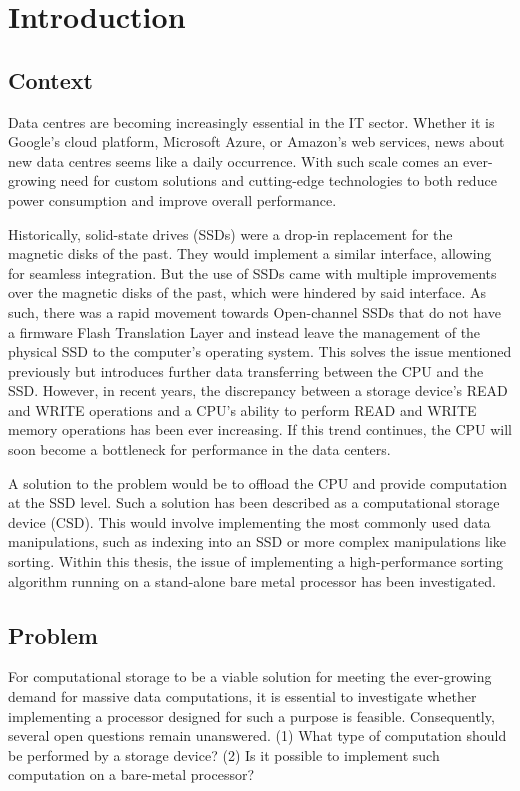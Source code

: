 \section{Introduction}
\subsection{Context}\label{sec:context}
Data centres are becoming increasingly essential in the IT sector. Whether it is
Google's cloud platform, Microsoft Azure, or Amazon's web services, news about
new data centres seems like a daily occurrence. With such scale comes an
ever-growing need for custom solutions and cutting-edge technologies to both
reduce power consumption and improve overall performance.

Historically, solid-state drives (SSDs) were a drop-in replacement for the
magnetic disks of the past. They would implement a similar interface, allowing
for seamless integration. But the use of SSDs came with multiple improvements
over the magnetic disks of the past, which were hindered by said interface. As
such, there was a rapid movement towards Open-channel SSDs that do not have a
firmware Flash Translation Layer and instead leave the management of the
physical SSD to the computer's operating system. This solves the issue mentioned
previously but introduces further data transferring between the CPU and the SSD.
However, in recent years, the discrepancy between a storage device's READ and
WRITE operations and a CPU's ability to perform READ and WRITE memory operations
has been ever increasing. If this trend continues, the CPU will soon become a
bottleneck for performance in the data centers.

A solution to the problem would be to offload the CPU and provide computation at
the SSD level. Such a solution has been described as a computational storage
device (CSD). This would involve implementing the most commonly used data
manipulations, such as indexing into an SSD or more complex manipulations like
sorting. Within this thesis, the issue of implementing a high-performance
sorting algorithm running on a stand-alone bare metal processor has been
investigated.


\subsection{Problem}
For computational storage to be a viable solution for meeting the ever-growing
demand for massive data computations, it is essential to investigate whether
implementing a processor designed for such a purpose is feasible. Consequently,
several open questions remain unanswered. (1) What type of computation should be
performed by a storage device? (2) Is it possible to implement such computation
on a bare-metal processor?


